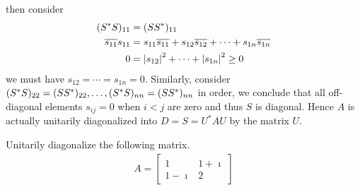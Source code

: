 then consider
\begin{align*}
(S^*S)_{11} &= (SS^*)_{11} \\
\overline{s_{11}}s_{11} &= s_{11}\overline{s_{11}} + s_{12}\overline{s_{12}} + \cdots + s_{1n}\overline{s_{1n}} \\
0 &= \abs{s_{12}}^2 + \cdots + \abs{s_{1n}}^2 \geq 0
\end{align*}
we must have $s_{12} = \cdots = s_{1n} = 0$. Similarly, consider $(S^*S)_{22} = (SS^*)_{22}, \ldots, \\ (S^*S)_{nn} = (SS^*)_{nn}$ in order, we conclude that all off-diagonal elements $s_{ij} = 0$ when $i < j$ are zero and thus $S$ is diagonal. Hence $A$ is actually unitarily diagonalized into $D = S = U^*AU$ by the matrix $U$.

\begin{exmp}
Unitarily diagonalize the following matrix.
\begin{align*}
A =
\begin{bmatrix}
1 & 1+\imath \\
1-\imath & 2
\end{bmatrix}
\end{align*}
\end{exmp}
